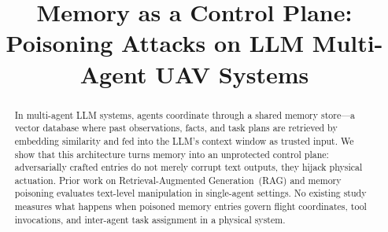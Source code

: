\documentclass[conference]{IEEEtran}
\begin{document}
\title{Memory as a Control Plane: Poisoning Attacks on LLM Multi-Agent UAV Systems}

\author{
}

\maketitle

\begin{abstract}
In multi-agent LLM systems, agents coordinate through a shared memory store---a vector database where past observations, facts, and task plans are retrieved by embedding similarity and fed into the LLM's context window as trusted input. We show that this architecture turns memory into an unprotected control plane: adversarially crafted entries do not merely corrupt text outputs, they hijack physical actuation. Prior work on Retrieval-Augmented Generation~(RAG) and memory poisoning evaluates text-level manipulation in single-agent settings. No existing study measures what happens when poisoned memory entries govern flight coordinates, tool invocations, and inter-agent task assignment in a physical system.


\end{abstract}
\end{document}
